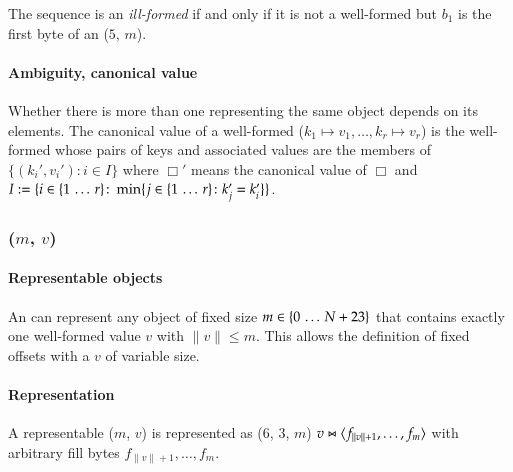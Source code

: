 The sequence is an \emph{ill-formed} \DborDictionaryValue{} if and only if it is not a well-formed
\DborDictionaryValue{} but $b_1$ is the first byte of an \DborIntegerToken*($5$, $m$).


\paragraph{Ambiguity, canonical value}

Whether there is more than one \DborDictionaryValue{} representing the same object depends on its elements.
The canonical value of a well-formed \DborDictionaryValue($k_1 \mapsto v_1, \ldots, k_r \mapsto v_r$) is
the well-formed \DborDictionaryValue{} whose pairs of keys and associated values are the members of
$\{(k_i', v_i') \colon i \in I\}$ where $\Box'$ means the canonical value of $\Box$ and
$I := \{i \in \{1 \,\ldots\, r\}\colon \min\{j \in \{1 \,\ldots\, r\}\colon k_j' = k_i'\}\}$.


\subsubsection{\DborAllocatedValue(\texorpdfstring{$m$, $v$}{m, v})}
\hypertarget{sec:def:AllocatedValue}{}

\paragraph{Representable objects}

An \DborAllocatedValue{} can represent any object of fixed size $m \in \{0 \,\ldots\, N + 23\}$
that contains exactly one well-formed value $v$ with $\|v\| \le m$.
This allows the definition of fixed offsets with a $v$ of variable size.

\paragraph{Representation}

A representable \DborAllocatedValue($m$, $v$) is represented as
\DborNaturalToken*($6$, $3$, $m$) {\Concat} $v \Concat \ByteSequence{f_{\|v\| + 1}, \ldots, f_m}$
with arbitrary fill bytes $f_{\|v\| + 1}, \ldots, f_m$.

